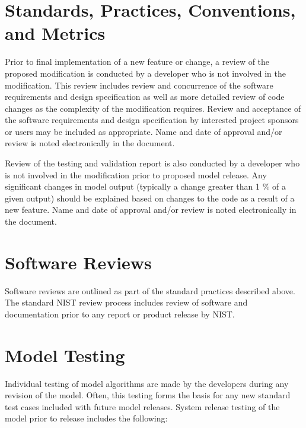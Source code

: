 \section{Standards, Practices, Conventions, and Metrics}

Prior to final implementation of a new feature or change, a review of the proposed modification is conducted by a developer who is not involved in the modification.  This review includes review and concurrence of the software requirements and design specification as well as more detailed review of code changes as the complexity of the modification requires. Review and acceptance of the software requirements and design specification by interested project sponsors or users may be included as appropriate. Name and date of approval and/or review is noted electronically in the document.

Review of the testing and validation report is also conducted by a developer who is not involved in the modification prior to proposed model release. Any significant changes in model output (typically a change greater than 1 \% of a given output) should be explained based on changes to the code as a result of a new feature.  Name and date of approval and/or review is noted electronically in the document.

\section{Software Reviews}

Software reviews are outlined as part of the standard practices described above.  The standard NIST review process includes review of software and documentation prior to any report or product release by NIST.

\section{Model Testing}

Individual testing of model algorithms are made by the developers during any revision of the model. Often, this testing forms the basis for any new standard test cases included with future model releases. System release testing of the model prior to release includes the following:

